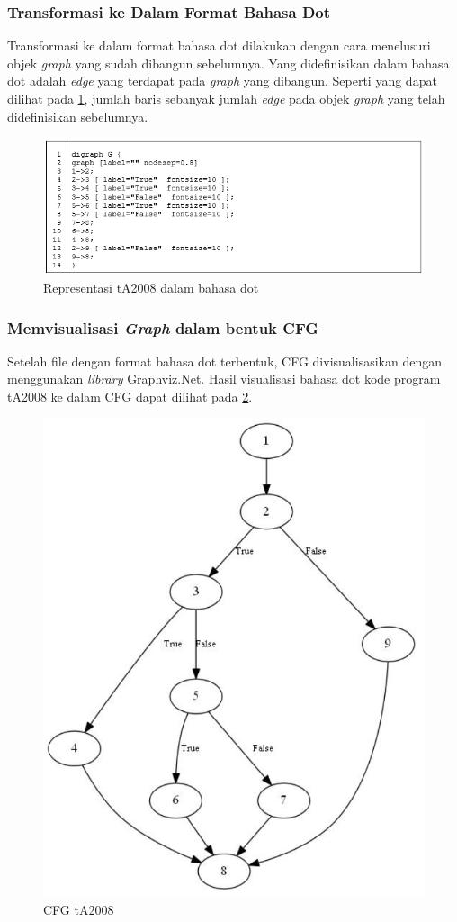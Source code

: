 \subsubsection*{Transformasi ke Dalam Format Bahasa Dot}
Transformasi ke dalam format bahasa dot dilakukan dengan cara menelusuri objek \textit{graph} yang sudah dibangun sebelumnya. Yang didefinisikan dalam bahasa dot adalah \textit{edge} yang terdapat pada \textit{graph} yang dibangun. Seperti yang dapat dilihat pada \ref{fig:dot}, jumlah baris sebanyak jumlah \textit{edge} pada objek \textit{graph} yang telah didefinisikan sebelumnya.
\begin{figure}
	\centering
	\includegraphics[width=0.95\linewidth]{gambar/dot}
	\caption{Representasi tA2008 dalam bahasa dot}
	\label{fig:dot}
\end{figure}

\subsubsection*{Memvisualisasi \textit{Graph} dalam bentuk CFG}
Setelah file dengan format bahasa dot terbentuk, CFG divisualisasikan dengan menggunakan \textit{library} Graphviz.Net. Hasil visualisasi bahasa dot kode program tA2008 ke dalam CFG dapat dilihat pada \ref{fig:cfgta2008}.
\begin{figure}
	\centering
	\includegraphics[width=0.85\linewidth]{gambar/cfgtA2008}
	\caption{CFG tA2008}
	\label{fig:cfgta2008}
\end{figure}

